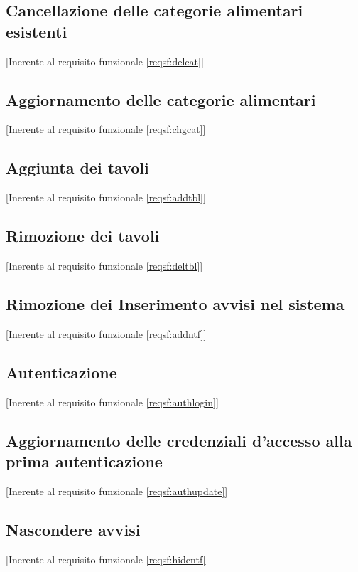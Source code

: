 	\newpage\subsection{Cancellazione delle categorie alimentari esistenti}[Inerente al requisito funzionale \ref{reqsf:delcat}]

	\newpage\subsection{Aggiornamento delle categorie alimentari}[Inerente al requisito funzionale \ref{reqsf:chgcat}]

	\newpage\subsection{Aggiunta dei tavoli}[Inerente al requisito funzionale \ref{reqsf:addtbl}]

	\newpage\subsection{Rimozione dei tavoli}[Inerente al requisito funzionale \ref{reqsf:deltbl}]

	\newpage\subsection{Rimozione dei Inserimento avvisi nel sistema}[Inerente al requisito funzionale \ref{reqsf:addntf}]

	\newpage\subsection{Autenticazione}[Inerente al requisito funzionale \ref{reqsf:authlogin}]

	\newpage\subsection{Aggiornamento delle credenziali d'accesso alla prima autenticazione}[Inerente al requisito funzionale \ref{reqsf:authupdate}]

	\newpage\subsection{Nascondere avvisi}[Inerente al requisito funzionale \ref{reqsf:hidentf}]

